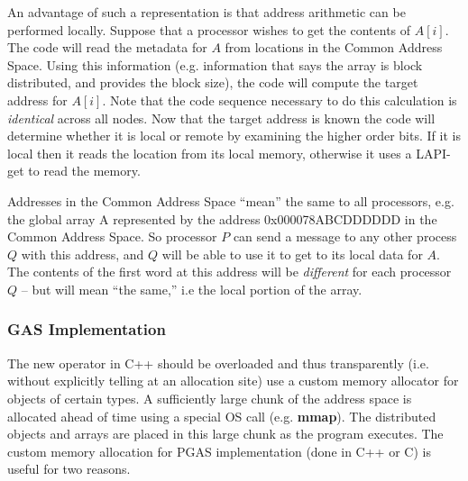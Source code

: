 An advantage of such a representation is that address arithmetic can be 
performed locally. Suppose that a processor wishes to get the contents 
of $A[i]$. The code will read the metadata for $A$ from locations in the  
Common Address Space. Using this information (e.g.{} information that says 
the array is block distributed, and provides the block size), the code 
will compute the target address for $A[i]$. Note that the code sequence 
necessary to do this calculation is {\em identical} across all nodes. Now 
that the target address is known the code will determine whether it is 
local or remote by examining the higher order bits. If it is local then 
it reads the location from its local memory, otherwise it uses a 
LAPI-get to read the memory.


Addresses in the Common Address Space ``mean'' the same to all
processors, e.g. the global array A represented by the address
0x000078ABCDDDDDD in the Common Address Space. So processor $P$ can send
a message to any other process $Q$ with this address, and $Q$ will be
able to use it to get to its local data for $A$. The contents of the
first word at this address will be {\em different} for each processor
$Q$ -- but will mean ``the same,'' i.e the local portion of the array.

\subsubsection {GAS Implementation}

The new operator in C++ should be overloaded and thus transparently
(i.e. without explicitly telling at an allocation site) use a custom
memory allocator for objects of certain types.  A sufficiently large
chunk of the address space is allocated ahead of time using a special OS
call (e.g. {\bf mmap}). The distributed objects and arrays are placed in
this large chunk as the program executes.  The custom memory allocation
for PGAS implementation (done in C++ or C) is useful for two reasons.

